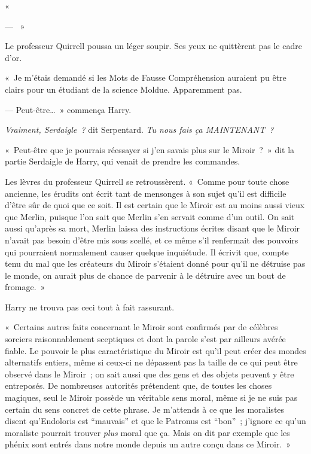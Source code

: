 «~

--- ~»

Le professeur Quirrell poussa un léger soupir. Ses yeux ne quittèrent pas le cadre d'or.

«~Je m'étais demandé si les Mots de Fausse Compréhension auraient pu être clairs pour un étudiant de la science Moldue. Apparemment pas.

--- Peut-être…~» commença Harry.

\emph{Vraiment, Serdaigle~?} dit Serpentard. \emph{Tu nous fais ça MAINTENANT~?}

«~Peut-être que je pourrais réessayer si j'en savais plus sur le Miroir~?~» dit la partie Serdaigle de Harry, qui venait de prendre les commandes.

Les lèvres du professeur Quirrell se retroussèrent. «~Comme pour toute chose ancienne, les érudits ont écrit tant de mensonges à son sujet qu'il est difficile d'être sûr de quoi que ce soit. Il est certain que le Miroir est au moins aussi vieux que Merlin, puisque l'on sait que Merlin s'en servait comme d'un outil. On sait aussi qu'après sa mort, Merlin laissa des instructions écrites disant que le Miroir n'avait pas besoin d'être mis sous scellé, et ce même s'il renfermait des pouvoirs qui pourraient normalement causer quelque inquiétude. Il écrivit que, compte tenu du mal que les créateurs du Miroir s'étaient donné pour qu'il ne détruise pas le monde, on aurait plus de chance de parvenir à le détruire avec un bout de fromage.~»

Harry ne trouva pas ceci tout à fait rassurant.

«~Certains autres faits concernant le Miroir sont confirmés par de célèbres sorciers raisonnablement sceptiques et dont la parole s'est par ailleurs avérée fiable. Le pouvoir le plus caractéristique du Miroir est qu'il peut créer des mondes alternatifs entiers, même si ceux-ci ne dépassent pas la taille de ce qui peut être observé dans le Miroir~; on sait aussi que des gens et des objets peuvent y être entreposés. De nombreuses autorités prétendent que, de toutes les choses magiques, seul le Miroir possède un véritable sens moral, même si je ne suis pas certain du sens concret de cette phrase. Je m'attends à ce que les moralistes disent qu'Endoloris est “mauvais” et que le Patronus est “bon”~; j'ignore ce qu'un moraliste pourrait trouver \emph{plus} moral que ça. Mais on dit par exemple que les phénix sont entrés dans notre monde depuis un autre conçu dans ce Miroir.~»

